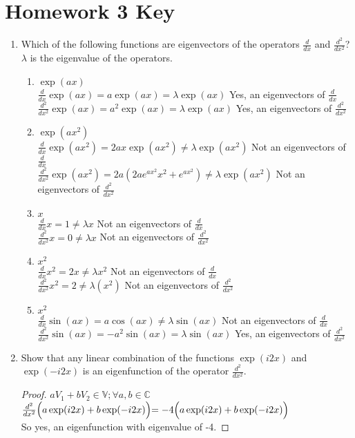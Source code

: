 \documentclass{article}
\begin{document}
\section*{Homework 3 Key}
 
\begin{enumerate}%

\item Which of the following functions are eigenvectors of the operators $\frac{d}{dx}$ and $\frac{d^2}{dx^2}$?
    \\$\lambda$ is the eigenvalue of the operators.
    \begin{enumerate}%
    \item $\exp(ax)$
    \\$\frac{d}{dx}\exp(ax)=a\exp(ax)=\lambda\exp(ax)$ Yes, an eigenvectors of $\frac{d}{dx}$
    \\$\frac{d^2}{dx^2}\exp(ax)=a^2\exp(ax)=\lambda\exp(ax)$ Yes, an eigenvectors of $\frac{d^2}{dx^2}$
    \item $\exp(ax^2)$
    \\$\frac{d}{dx}\exp(ax^2)=2ax\exp(ax^2)\neq\lambda\exp(ax^2)$ Not an eigenvectors of $\frac{d}{dx}$
    \\$\frac{d^2}{dx^2}\exp(ax^2)=2a(2ae^{ax^2}x^2+e^{ax^2})\neq\lambda\exp(ax^2)$ Not an eigenvectors of $\frac{d^2}{dx^2}$
    \item $x$
    \\$\frac{d}{dx}x=1\neq\lambda x$ Not an eigenvectors of $\frac{d}{dx}$
    \\$\frac{d^2}{dx^2}x=0\neq\lambda x
    $ Not an eigenvectors of $\frac{d^2}{dx^2}$
    \item $x^2$
    \\$\frac{d}{dx}x^2=2x\neq\lambda x^2$ Not an eigenvectors of $\frac{d}{dx}$
    \\$\frac{d^2}{dx^2}x^2=2\neq\lambda(x^2)$ Not an eigenvectors of $\frac{d^2}{dx^2}$
    \item $x^2$
    \\$\frac{d}{dx}\sin(ax)=a\cos(ax)\neq\lambda\sin(ax) $ Not an eigenvectors of $\frac{d}{dx}$
    \\$\frac{d^2}{dx^2}\sin(ax)=-a^2\sin(ax)=\lambda\sin(ax)$ Yes, an eigenvectors of $\frac{d^2}{dx^2}$
    \end{enumerate}%

\item Show that any linear combination of the functions $\exp(i2x)$ and $\exp(-i2x)$ is an eigenfunction of the operator $\frac{d^2}{dx^2}$.
\begin{proof} $aV_1+bV_2 \in \mathbb{V}; \forall a,b \in \mathbb{C}$
\\ $\frac{d^2}{dx^2}\Bigl(a\exp(i2x)+b\exp(-i2x)\Bigl)=-4\Bigl(a\exp(i2x)+b\exp(-i2x)\Bigl)$
\\ So yes, an eigenfunction with eigenvalue of -4.\end{proof}


\end{enumerate}
\end{document}
